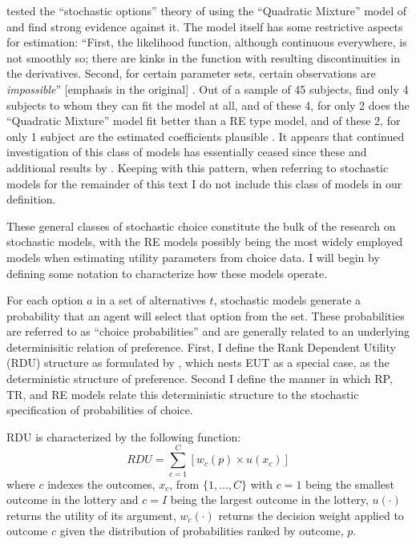\documentclass[../main.tex]{subfiles}
\begin{document}
\textcite{Hey1995} tested the \enquote{stochastic options} theory of \textcite{Machina1985} using the \enquote{Quadratic Mixture} model of \textcite{Chew1991} and find strong evidence against it.
The model itself has some restrictive aspects for estimation: \enquote{First, the likelihood function, although continuous everywhere, is not smoothly so; there are kinks in the function with resulting discontinuities in the derivatives.
Second, for certain parameter sets, certain observations are \textit{impossible}} [emphasis in the original] \parencite*[164]{Hey1995}.
Out of a sample of 45 subjects, \textcite{Hey1995} find only 4 subjects to whom they can fit the model at all, and of these 4, for only 2 does the \enquote{Quadratic Mixture} model fit better than a RE type model, and of these 2, for only 1 subject are the estimated coefficients plausible \parencite*[167]{Hey1995}.
It appears that continued investigation of this class of models has essentially ceased since these and additional results by \textcite{Camerer1994}.
Keeping with this pattern, when referring to stochastic models for the remainder of this text I do not include this class of models in our definition.

These general classes of stochastic choice constitute the bulk of the research on stochastic models, with the RE models possibly being the most widely employed models when estimating utility parameters from choice data.
I will begin by defining some notation to characterize how these models operate.

For each option $a$ in a set of alternatives $t$, stochastic models generate a probability that an agent will select that option from the set.
These probabilities are referred to as \enquote{choice probabilities} and are generally related to an underlying determinisitic relation of preference.
First, I define the Rank Dependent Utility (RDU) structure as formulated by \textcite{Quiggin1982}, which nests EUT as a special case, as the deterministic structure of preference.
Second I define the manner in which RP, TR, and RE  models relate this deterministic structure to the stochastic specification of probabilities of choice.

RDU is characterized by the following function:
\begin{equation}
	\label{eq2:RDU}
	RDU = \sum_{c=1}^{C} \left[ w_c(p) \times u(x_c) \right]
\end{equation}
\noindent where $c$ indexes the outcomes, $x_c$, from $\{1,\ldots,C\}$ with $c=1$ being the smallest outcome in the lottery and $c=I$ being the largest outcome in the lottery, $u(\cdot)$ returns the utility of its argument, $w_c(\cdot)$ returns the decision weight applied to outcome $c$ given the distribution of probabilities ranked by outcome, $p$.
\end{document}
